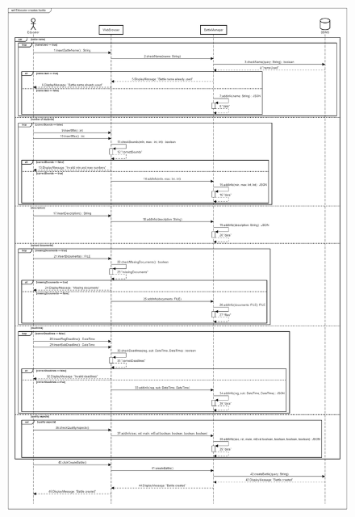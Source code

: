 \documentclass[12pt,oneside,a4paper]{article}
\begin{document}
\begin{figure}[htbp]
    \centering
    \includegraphics[width=1\linewidth]{Images//Sequence Diagrams/educatorCreatesBattle2.png}
    \label{fig:enter-label}
\end{figure}
\clearpage
\end{document}
